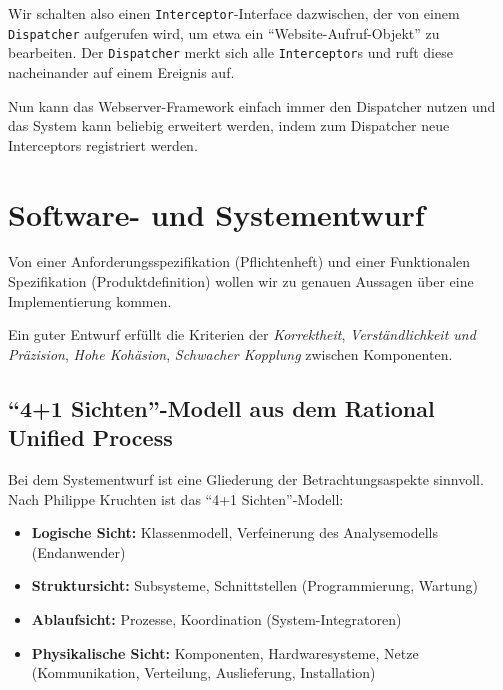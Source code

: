 \documentclass{panikzettel}
\begin{document}
Wir schalten also einen \lstinline{Interceptor}-Interface dazwischen, der von einem \lstinline{Dispatcher} aufgerufen wird, um etwa ein ``Website-Aufruf-Objekt'' zu bearbeiten. Der \lstinline{Dispatcher} merkt sich alle \lstinline{Interceptor}s und ruft diese nacheinander auf einem Ereignis auf.


Nun kann das Webserver-Framework einfach immer den Dispatcher nutzen und das System kann beliebig erweitert werden, indem zum Dispatcher neue Interceptors registriert werden.

\section{Software- und Systementwurf}

Von einer Anforderungsspezifikation (Pflichtenheft) und einer Funktionalen Spezifikation (Produktdefinition) wollen wir zu genauen Aussagen über eine Implementierung kommen.

Ein guter Entwurf erfüllt die Kriterien der \emph{Korrektheit}, \emph{Verständlichkeit und Präzision}, \emph{Hohe Kohäsion}, \emph{Schwacher Kopplung} zwischen Komponenten.

\subsection{``4+1 Sichten''-Modell aus dem Rational Unified Process}

Bei dem Systementwurf ist eine Gliederung der Betrachtungsaspekte sinnvoll. Nach Philippe Kruchten ist das ``4+1 Sichten''-Modell:

\begin{itemize}
\item \textbf{Logische Sicht:} Klassenmodell, Verfeinerung des Analysemodells (Endanwender)
\item \textbf{Struktursicht:} Subsysteme, Schnittstellen (Programmierung, Wartung)
\item \textbf{Ablaufsicht:} Prozesse, Koordination (System-Integratoren)
\item \textbf{Physikalische Sicht:} Komponenten, Hardwaresysteme, Netze (Kommunikation, Verteilung, Auslieferung, Installation)
\end{itemize}
\end{document}
